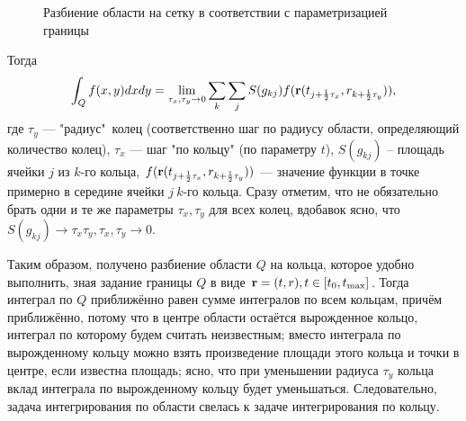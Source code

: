 \documentclass[a4paper, 12pt]{article}
\begin{document}
\begin{figure}[h!]
  \noindent{}
  \caption{Разбиение области на сетку в соответствии с параметризацией границы}
  \label{plast}
  \end{figure} 

Тогда $$\int_Q f(x,y)dx dy=\lim_{\tau_x, \tau_y \rightarrow 0} \sum_k \sum_j S(g_{kj}) f({\bf r}(t_{j+\frac{1}{2}\tau_x},r_{k+\frac{1}{2}\tau_y})),$$
где $\tau_y$ --- "радиус"\ колец (соответственно шаг по радиусу области, определяющий количество колец),
$\tau_x$ --- шаг "по кольцу" (по параметру $t$), $S(g_{kj})$ -- площадь ячейки $j$ из $k$-го кольца,
$f({\bf r}(t_{j+\frac{1}{2}\tau_x},r_{k+\frac{1}{2}\tau_y}))$ --- значение функции в точке примерно в середине ячейки $j\ k$-го кольца. 
Сразу отметим, что не обязательно брать одни и те же параметры $\tau_x, \tau_y$ для всех колец, вдобавок ясно, что $S(g_{kj}) \rightarrow \tau_x \tau_y, \tau_x, \tau_y \rightarrow 0$.

Таким образом, получено разбиение области $Q$ на кольца, которое удобно выполнить, зная задание границы $Q$ в виде ${\bf r}=(t,r), t \in [t_0,t_{\max}]$. Тогда интеграл по $Q$ приближённо равен сумме интегралов по всем кольцам, причём приближённо, потому что в центре области остаётся вырожденное кольцо, интеграл по которому будем считать неизвестным; вместо интеграла по вырожденному кольцу можно взять произведение площади этого кольца и точки в центре, если известна площадь; ясно, что при уменьшении радиуса $\tau_y$ кольца вклад интеграла по вырожденному кольцу будет уменьшаться.
Следовательно, задача интегрирования по области свелась к задаче интегрирования по кольцу.
\end{document}
